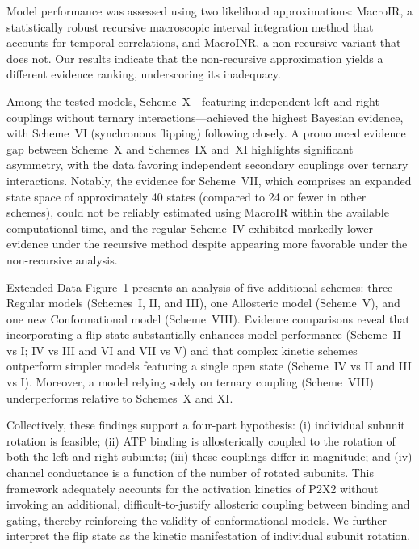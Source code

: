 \documentclass[pdflatex,sn-mathphys-num]{sn-jnl}%
\theoremstyle{thmstyleone}%
\theoremstyle{thmstyletwo}%
\theoremstyle{thmstylethree}%
\begin{document}
Model performance was assessed using two likelihood approximations: MacroIR, a statistically robust recursive macroscopic interval integration method that accounts for temporal correlations, and MacroINR, a non-recursive variant that does not. Our results indicate that the non-recursive approximation yields a different evidence ranking, underscoring its inadequacy.

Among the tested models, Scheme~X—featuring independent left and right couplings without ternary interactions—achieved the highest Bayesian evidence, with Scheme~VI (synchronous flipping) following closely. A pronounced evidence gap between Scheme~X and Schemes~IX and~XI highlights significant asymmetry, with the data favoring independent secondary couplings over ternary interactions. Notably, the evidence for Scheme~VII, which comprises an expanded state space of approximately 40 states (compared to 24 or fewer in other schemes), could not be reliably estimated using MacroIR within the available computational time, and the regular Scheme~IV exhibited markedly lower evidence under the recursive method despite appearing more favorable under the non-recursive analysis.

Extended Data Figure~1 presents an analysis of five additional schemes: three Regular models (Schemes~I, II, and III), one Allosteric model (Scheme~V), and one new Conformational model (Scheme~VIII). Evidence comparisons reveal that incorporating a flip state substantially enhances model performance (Scheme~II vs I; IV vs III and VI and VII vs V) and that complex kinetic schemes outperform simpler models featuring a single open state (Scheme~IV vs II and III vs I). Moreover, a model relying solely on ternary coupling (Scheme~VIII) underperforms relative to Schemes~X and XI.

Collectively, these findings support a four-part hypothesis: (i) individual subunit rotation is feasible; (ii) ATP binding is allosterically coupled to the rotation of both the left and right subunits; (iii) these couplings differ in magnitude; and (iv) channel conductance is a function of the number of rotated subunits. This framework adequately accounts for the activation kinetics of P2X2 without invoking an additional, difficult-to-justify allosteric coupling between binding and gating, thereby reinforcing the validity of conformational models. We further interpret the flip state as the kinetic manifestation of individual subunit rotation.
\end{document}
